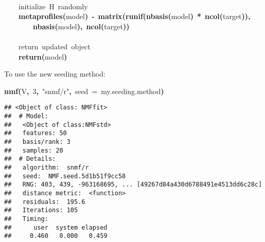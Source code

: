 \documentclass[a4paper]{article}\usepackage{graphicx, color}
\makeatletter
\newcommand{\hlnumber}[1]{\textcolor[rgb]{0,0,0}{#1}}%
\newcommand{\hlfunctioncall}[1]{\textcolor[rgb]{0.501960784313725,0,0.329411764705882}{\textbf{#1}}}%
\newcommand{\hlstring}[1]{\textcolor[rgb]{0.6,0.6,1}{#1}}%
\newcommand{\hlkeyword}[1]{\textcolor[rgb]{0,0,0}{\textbf{#1}}}%
\newcommand{\hlargument}[1]{\textcolor[rgb]{0.690196078431373,0.250980392156863,0.0196078431372549}{#1}}%
\newcommand{\hlcomment}[1]{\textcolor[rgb]{0.180392156862745,0.6,0.341176470588235}{#1}}%
\newcommand{\hlassignement}[1]{\textcolor[rgb]{0,0,0}{\textbf{#1}}}%
\newcommand{\hlsymbol}[1]{\textcolor[rgb]{0,0,0}{#1}}%
\newcommand{\hlstd}[1]{\textcolor[rgb]{0,0,0}{#1}}%
\newenvironment{kframe}{%
 \def\FrameCommand##1{\hskip\@totalleftmargin \hskip-\fboxsep
 \colorbox{shadecolor}{##1}\hskip-\fboxsep
     \hskip-\linewidth \hskip-\@totalleftmargin \hskip\columnwidth}%
 \MakeFramed {\advance\hsize-\width
   \@totalleftmargin\z@ \linewidth\hsize
   \@setminipage}}%
 {\par\unskip\endMakeFramed}
\newenvironment{knitrout}{}{} %
\makeatother
\begin{document}
\begin{knitrout}
\begin{kframe}
\begin{flushleft}
\hlstd{}\hspace*{\fill}\\
\hlstd{}{\ }{\ }{\ }{\ }\hlcomment{\usebox{\hlnormalsizeboxhash}{\ }initialize{\ }H{\ }randomly}\hspace*{\fill}\\
\hlstd{}{\ }{\ }{\ }{\ }\hlfunctioncall{metaprofiles}\hlkeyword{(}\hlsymbol{model}\hlkeyword{)}{\ }\hlassignement{\usebox{\hlnormalsizeboxlessthan}-}{\ }\hlfunctioncall{matrix}\hlkeyword{(}\hlfunctioncall{runif}\hlkeyword{(}\hlfunctioncall{nbasis}\hlkeyword{(}\hlsymbol{model}\hlkeyword{)}{\ }\hlkeyword{*}{\ }\hlfunctioncall{ncol}\hlkeyword{(}\hlsymbol{target}\hlkeyword{)}\hlkeyword{)}\hlkeyword{,}\hspace*{\fill}\\
\hlstd{}{\ }{\ }{\ }{\ }{\ }{\ }{\ }{\ }\hlfunctioncall{nbasis}\hlkeyword{(}\hlsymbol{model}\hlkeyword{)}\hlkeyword{,}{\ }\hlfunctioncall{ncol}\hlkeyword{(}\hlsymbol{target}\hlkeyword{)}\hlkeyword{)}\hspace*{\fill}\\
\hlstd{}\hspace*{\fill}\\
\hlstd{}{\ }{\ }{\ }{\ }\hlcomment{\usebox{\hlnormalsizeboxhash}{\ }return{\ }updated{\ }object}\hspace*{\fill}\\
\hlstd{}{\ }{\ }{\ }{\ }\hlfunctioncall{return}\hlkeyword{(}\hlsymbol{model}\hlkeyword{)}\hspace*{\fill}\\
\hlstd{}\hlkeyword{\usebox{\hlnormalsizeboxclosebrace}}\mbox{}
\normalfont
\end{flushleft}
\end{kframe}
\end{knitrout}


To use the new seeding method:
\begin{knitrout}
\color{fgcolor}\begin{kframe}
\begin{flushleft}
\ttfamily\noindent
\hlfunctioncall{nmf}\hlkeyword{(}\hlsymbol{V}\hlkeyword{,}{\ }\hlnumber{3}\hlkeyword{,}{\ }\hlstring{"{}snmf/r"{}}\hlkeyword{,}{\ }\hlargument{seed}{\ }\hlargument{=}{\ }\hlsymbol{my.seeding.method}\hlkeyword{)}\mbox{}
\normalfont
\end{flushleft}
\begin{verbatim}
## <Object of class: NMFfit>
##  # Model:
##   <Object of class:NMFstd>
##   features: 50 
##   basis/rank: 3 
##   samples: 20 
##  # Details:
##   algorithm:  snmf/r 
##   seed:  NMF.seed.5d1b51f9cc58 
##   RNG: 403, 439, -963168695, ... [49267d84a430d6788491e4513dd6c28c]
##   distance metric:  <function> 
##   residuals:  195.6 
##   Iterations: 105 
##   Timing:
##      user  system elapsed 
##     0.460   0.000   0.459 
\end{verbatim}
\end{kframe}
\end{knitrout}
\end{document}
